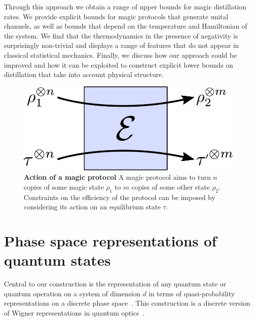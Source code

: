 \documentclass[pra,
aps,
twocolumn,
superscriptaddress,
groupedaddress,
nofootinbib,
reprint
]{revtex4-1}
\begin{document}
Through this approach we obtain a range of upper bounds for magic distillation rates. We provide explicit bounds for magic protocols that generate unital channels, as well as bounds that depend on the temperature and Hamiltonian of the system. We find that the thermodynamics in the presence of negativity is surprisingly non-trivial and displays a range of features that do not appear in classical statistical mechanics. 
Finally, we discuss how our approach could be improved and how it can be exploited to construct explicit lower bounds on distillation that take into account physical structure.

\begin{figure}[t]
    \centering
        \includegraphics[scale=0.4]{figs/protocol_diagram.pdf}
    \caption{\textbf{Action of a magic protocol} 
	A magic protocol aims to turn $n$ copies of some magic state $\rho_1$ to $m$ copies of some other state $\rho_2$.
	Constraints on the efficiency of the protocol can be imposed by considering its action on an equilibrium state $\tau$.
    }
    \label{fig:zoo}
\end{figure}

\section{Phase space representations of quantum states}
\label{sec:ps}

Central to our construction is the representation of any quantum state or quantum operation on a system of dimension $d$ in terms of quasi-probability representations on a discrete phase space~\cite{Ferrie_2008}. This construction is a discrete version of Wigner representations in quantum optics~\cite{Wigner_1932, Vourdas_2004}.
\end{document}
